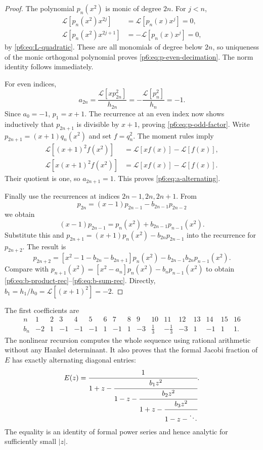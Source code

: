 \documentclass[11pt]{article}
\theoremstyle{definition}
\theoremstyle{remark}
\newcommand{\cL}{\mathcal L}
\begin{document}
\begin{proof}
The polynomial \(p_n(x^2)\) is monic of degree \(2n\).  For \(j<n\),
\begin{align*}
 \cL[p_n(x^2)x^{2j}]&=\cL[p_n(x)x^j]=0,\\
 \cL[p_n(x^2)x^{2j+1}]&=-\cL[p_n(x)x^j]=0,
\end{align*}
by \eqref{p6:eq:L-quadratic}.  These are all monomials of degree below \(2n\), so uniqueness
of the monic orthogonal polynomial proves \eqref{p6:eq:p-even-decimation}.  The norm identity
follows immediately.

For even indices,
\[
 a_{2n}=\frac{\cL[xp_{2n}^2]}{h_{2n}}
 =-\frac{\cL[p_n^2]}{h_n}=-1.
\]
Since \(a_0=-1\), \(p_1=x+1\).  The recurrence at an even index now shows inductively that
\(p_{2n+1}\) is divisible by \(x+1\), proving \eqref{p6:eq:p-odd-factor}.
Write \(p_{2n+1}=(x+1)q_n(x^2)\) and set \(f=q_n^2\).  The moment rules imply
\begin{align*}
 \cL[(x+1)^2f(x^2)]
 &=\cL[xf(x)]-\cL[f(x)],\\
 \cL[x(x+1)^2f(x^2)]
 &=\cL[xf(x)]-\cL[f(x)].
\end{align*}
Their quotient is one, so \(a_{2n+1}=1\).  This proves
\eqref{p6:eq:a-alternating}.

Finally use the recurrences at indices \(2n-1,2n,2n+1\).  From
\[
 p_{2n}=(x-1)p_{2n-1}-b_{2n-1}p_{2n-2}
\]
we obtain
\[
 (x-1)p_{2n-1}=p_n(x^2)+b_{2n-1}p_{n-1}(x^2).
\]
Substitute this and
\(
 p_{2n+1}=(x+1)p_n(x^2)-b_{2n}p_{2n-1}
\)
into the recurrence for \(p_{2n+2}\).  The result is
\[
 p_{2n+2}
 =[x^2-1-b_{2n}-b_{2n+1}]p_n(x^2)
 -b_{2n-1}b_{2n}p_{n-1}(x^2).
\]
Compare with
\(
 p_{n+1}(x^2)=[x^2-a_n]p_n(x^2)-b_np_{n-1}(x^2)
\)
to obtain \eqref{p6:eq:b-product-rec}--\eqref{p6:eq:b-sum-rec}.  Directly,
\(b_1=h_1/h_0=\cL[(x+1)^2]=-2\).
\end{proof}

The first coefficients are
\begin{equation}
\begin{array}{c|rrrrrrrrrrrrrrrr}
 n&1&2&3&4&5&6&7&8&9&10&11&12&13&14&15&16\\ \hline
 b_n&-2&1&-1&-1&-1&1&-1&1&-3&\frac13&-\frac13&-3&1&-1&1&1.
\end{array}                                                  \label{p6:eq:b-first-row}
\end{equation}
The nonlinear recursion computes the whole sequence using rational arithmetic without any
Hankel determinant.  It also proves that the formal Jacobi fraction of \(E\) has exactly
alternating diagonal entries:
\begin{equation}
 E(z)=\cfrac{1}{1+z-
 \cfrac{b_1z^2}{1-z-
 \cfrac{b_2z^2}{1+z-
 \cfrac{b_3z^2}{1-z-\ddots}}}}.                            \label{p6:eq:E-J-fraction}
\end{equation}
The equality is an identity of formal power series and hence analytic for sufficiently small
\(|z|\).
\end{document}

